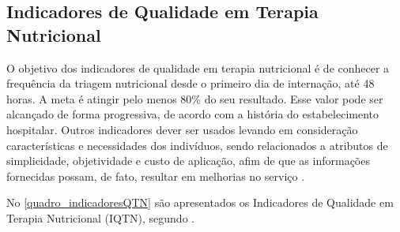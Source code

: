 \subsection{Indicadores de Qualidade em Terapia Nutricional} \label{subD-indicadores}
O objetivo dos indicadores de qualidade em terapia nutricional é de conhecer a frequência da triagem nutricional desde o primeiro dia de internação, até 48 horas. A meta é atingir pelo menos 80\% do seu resultado. Esse valor pode ser alcançado de forma progressiva, de acordo com a história do estabelecimento hospitalar. Outros indicadores dever ser usados levando em consideração características e necessidades dos indivíduos, sendo relacionados a atributos de simplicidade, objetividade e custo de aplicação, afim de que as informações fornecidas possam, de fato, resultar em melhorias no serviço \cite{manualnutricao2016}.

No \autoref{quadro_indicadoresQTN} são apresentados os Indicadores de Qualidade em Terapia Nutricional (IQTN), segundo \cite{protocolonutricionaladulto}.

